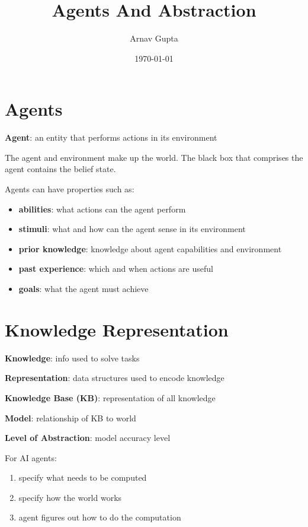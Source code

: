 \documentclass[11pt]{article}
\author{Arnav Gupta}
\date{\today}
\title{Agents And Abstraction}
\begin{document}
\maketitle
\tableofcontents

\section{Agents}
\label{sec:orgd7be80e}
\textbf{Agent}: an entity that performs actions in its environment

The agent and environment make up the world. The black box that comprises the agent
contains the belief state.

Agents can have properties such as:
\begin{itemize}
\item \textbf{abilities}: what actions can the agent perform
\item \textbf{stimuli}: what and how can the agent sense in its environment
\item \textbf{prior knowledge}: knowledge about agent capabilities and environment
\item \textbf{past experience}: which and when actions are useful
\item \textbf{goals}: what the agent must achieve
\end{itemize}
\section{Knowledge Representation}
\label{sec:org7299752}
\textbf{Knowledge}: info used to solve tasks

\textbf{Representation}: data structures used to encode knowledge

\textbf{Knowledge Base (KB)}: representation of all knowledge

\textbf{Model}: relationship of KB to world

\textbf{Level of Abstraction}: model accuracy level

For AI agents:
\begin{enumerate}
\item specify what needs to be computed
\item specify how the world works
\item agent figures out how to do the computation
\end{enumerate}
\end{document}
